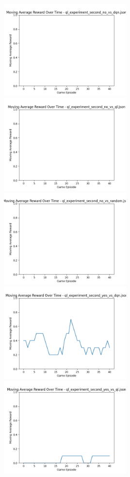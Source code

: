\includegraphics[width=0.5\textwidth]{images/moving_average_reward_ql_experiment_second_no_vs_dqn.png} 
\includegraphics[width=0.5\textwidth]{images/moving_average_reward_ql_experiment_second_no_vs_ql.png} 
\includegraphics[width=0.5\textwidth]{images/moving_average_reward_ql_experiment_second_no_vs_random.png} 
\includegraphics[width=0.5\textwidth]{images/moving_average_reward_ql_experiment_second_yes_vs_dqn.png} 
\includegraphics[width=0.5\textwidth]{images/moving_average_reward_ql_experiment_second_yes_vs_ql.png} 
